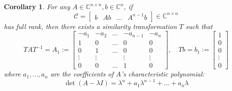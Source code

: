 \documentclass[
]{book}
\newtheorem{corollary}{Corollary}[chapter]
\theoremstyle{definition}
\theoremstyle{definition}
\theoremstyle{definition}
\theoremstyle{definition}
\theoremstyle{remark}
\begin{document}
\begin{corollary}
\protect\hypertarget{cor:cayham-4}{}\label{cor:cayham-4}For any \(A \in \mathbb{C}^{n \times n}, b \in \mathbb{C}^{n}\), if
\begin{equation*}
   \mathcal{C} = \begin{bmatrix}
      b & Ab & \dots & A^{n-1}b
   \end{bmatrix} \in \mathbb{C}^{n \times n}
\end{equation*}
has full rank, then there exists a similarity transformation \(T\) such that
\begin{equation*}
      T A T^{-1} = A_1 := \begin{bmatrix}
         -a_1 & -a_2 & \dots & -a_{n-1} & -a_n \\
         1 & 0 & \dots & 0 & 0 \\
         0 & 1 & \dots & 0 & 0 \\
         \vdots & \vdots &  & \vdots & \vdots \\
         0 & 0 & \dots & 1 & 0
      \end{bmatrix}, \quad
      T b = b_1 := \begin{bmatrix}
         1 \\ 0 \\ 0 \\ \vdots \\ 0
      \end{bmatrix}
\end{equation*}
where \(a_1, \dots, a_n\) are the coefficients of \(A\)'s characteristic polynomial:
\begin{equation*}
   \det(A - \lambda I) = \lambda^{n} + a_1 \lambda^{n-1} + \dots + a_n \lambda  
\end{equation*}
\end{corollary}
\end{document}
